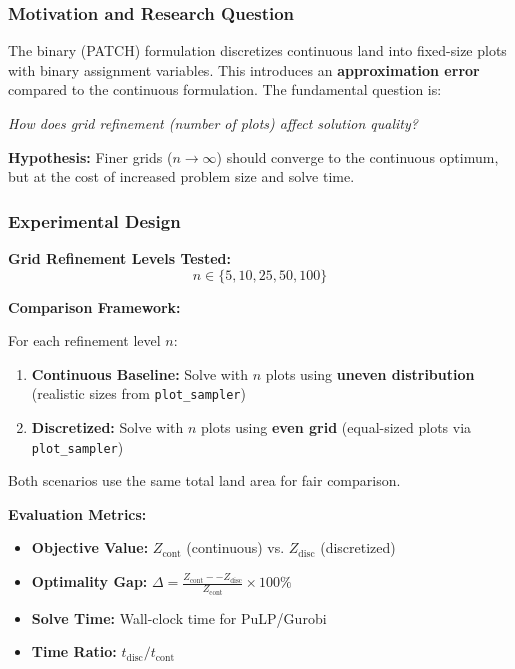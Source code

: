 \documentclass{oqireport}
\begin{document}
\subsubsection{Motivation and Research Question}

The binary (PATCH) formulation discretizes continuous land into fixed-size plots with binary assignment variables. This introduces an \textbf{approximation error} compared to the continuous formulation. The fundamental question is:

\begin{center}
\textit{How does grid refinement (number of plots) affect solution quality?}
\end{center}

\textbf{Hypothesis:} Finer grids ($n \to \infty$) should converge to the continuous optimum, but at the cost of increased problem size and solve time.

\subsubsection{Experimental Design}

\textbf{Grid Refinement Levels Tested:}
$$n \in \{5, 10, 25, 50, 100\}$$

\textbf{Comparison Framework:}

For each refinement level $n$:
\begin{enumerate}
    \item \textbf{Continuous Baseline:} Solve with $n$ plots using \textbf{uneven distribution} (realistic sizes from \texttt{plot\_sampler})
    \item \textbf{Discretized:} Solve with $n$ plots using \textbf{even grid} (equal-sized plots via \texttt{plot\_sampler})
\end{enumerate}

Both scenarios use the same total land area for fair comparison.

\textbf{Evaluation Metrics:}
\begin{itemize}
    \item \textbf{Objective Value:} $Z_{\text{cont}}$ (continuous) vs. $Z_{\text{disc}}$ (discretized)
    \item \textbf{Optimality Gap:} $\Delta = \frac{Z_{\text{cont}} -- Z_{\text{disc}}}{Z_{\text{cont}}} \times 100\%$
    \item \textbf{Solve Time:} Wall-clock time for PuLP/Gurobi
    \item \textbf{Time Ratio:} $t_{\text{disc}} / t_{\text{cont}}$
\end{itemize}
\end{document}
